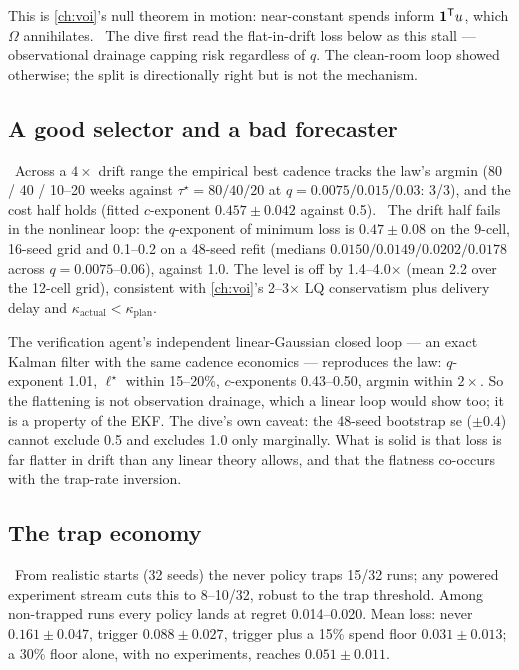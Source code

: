 This is \cref{ch:voi}'s null theorem in motion: near-constant spends inform $\mathbf{1}^{\mathsf{T}} u$, which $\Omega$ annihilates. \tagRefuted\ The dive first read the flat-in-drift loss below as this stall --- observational drainage capping risk regardless of $q$. The clean-room loop showed otherwise; the split is directionally right but is not the mechanism.

\subsection{A good selector and a bad forecaster}

\begin{law}
\label{fusion:law:selector}
\tagNumerical\ Across a $4\times$ drift range the empirical best cadence tracks the law's argmin (80 / 40 / 10--20 weeks against $\tau^\star = 80 / 40 / 20$ at $q = 0.0075 / 0.015 / 0.03$: 3/3), and the cost half holds (fitted $c$-exponent $0.457 \pm 0.042$ against 0.5). \tagRefuted\ The drift half fails in the nonlinear loop: the $q$-exponent of minimum loss is $0.47 \pm 0.08$ on the 9-cell, 16-seed grid and 0.1--0.2 on a 48-seed refit (medians $0.0150/0.0149/0.0202/0.0178$ across $q = 0.0075$--$0.06$), against 1.0. The level is off by 1.4--4.0$\times$ (mean 2.2 over the 12-cell grid), consistent with \cref{ch:voi}'s 2--3$\times$ LQ conservatism plus delivery delay and $\kappa_{\mathrm{actual}} < \kappa_{\mathrm{plan}}$.
\end{law}

The verification agent's independent linear-Gaussian closed loop --- an exact Kalman filter with the same cadence economics --- reproduces the law: $q$-exponent 1.01, $\ell^\star$ within 15--20\%, $c$-exponents 0.43--0.50, argmin within $2\times$. So the flattening is not observation drainage, which a linear loop would show too; it is a property of the EKF. The dive's own caveat: the 48-seed bootstrap se ($\pm 0.4$) cannot exclude 0.5 and excludes 1.0 only marginally. What is solid is that loss is far flatter in drift than any linear theory allows, and that the flatness co-occurs with the trap-rate inversion.

\subsection{The trap economy}

\begin{proposition}
\label{fusion:prop:insurance}
\tagNumerical\ From realistic starts (32 seeds) the never policy traps 15/32 runs; any powered experiment stream cuts this to 8--10/32, robust to the trap threshold. Among non-trapped runs every policy lands at regret 0.014--0.020. Mean loss: never $0.161 \pm 0.047$, trigger $0.088 \pm 0.027$, trigger plus a 15\% spend floor $0.031 \pm 0.013$; a 30\% floor alone, with no experiments, reaches $0.051 \pm 0.011$.
\end{proposition}

